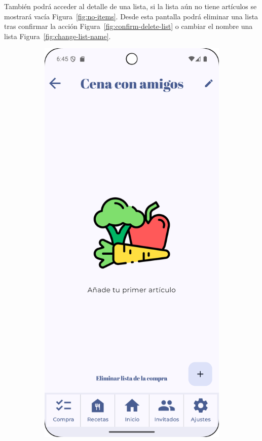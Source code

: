 También podrá acceder al detalle de una lista, si la lista aún no tiene artículos se mostrará vacía Figura~\ref{fig:no-items}. Desde esta pantalla podrá eliminar una lista tras confirmar la acción Figura~\ref{fig:confirm-delete-list} o cambiar el nombre una lista Figura~\ref{fig:change-list-name}.

\begin{figure}[H]
    \centering

    \begin{subfigure}[b]{0.3\textwidth}
      \includegraphics[width=\textwidth]{./img/manual/pinche_shopping_list_empty_items.png}

\end{subfigure}
\end{figure}
